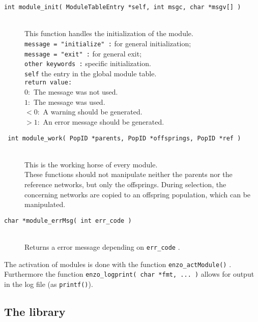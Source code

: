 \begin{description}
  \item[\tt int module\_init( ModuleTableEntry *self, int msgc, char *msgv{[]} )]%
    ~\\
    This function handles the initialization of the module.	\\
    \verb+message = "initialize" :+  for general  initialization;\\
    \verb+message = "exit" :+       for general exit;\\


    \verb+other keywords :+ specific  initialization.\\
    \verb+self+ the entry in the global module table.\\

     \verb+return value:+\\
       $0:$ The message was not used.\\
       $1:$ The message was used.\\
       $< 0:$ A warning should be generated.\\
       $> 1:$ An  error message should be generated.\\

	


  \item[\tt %
        int module\_work( PopID *parents, PopID *offsprings, PopID *ref )]~\\
	This is the working horse of every module.\\
	These functions should not manipulate neither the  parents nor the
	reference networks, but only the offsprings.
	During selection, the concerning networks are copied to an offspring
	population, which can be manipulated.


  \item[\tt char *module\_errMsg( int err\_code )]~\\
     Returns a error message depending on   \verb+err_code+ .
\end{description}

The activation of modules is done with the function 
\verb+enzo_actModule()+ .
Furthermore the function  \verb+enzo_logprint( char *fmt, ... )+ allows
for output in the log file (as \verb+printf()+).



\subsection{The \nepomuk library} %


